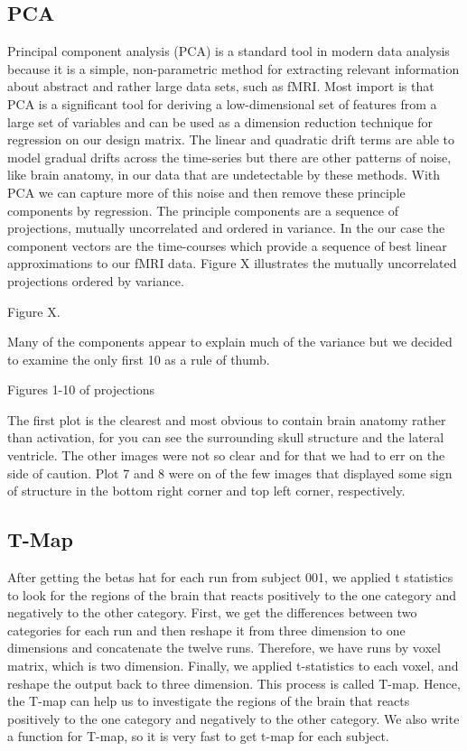 \documentclass[11pt]{article}
\begin{document}
\subsection{PCA}
Principal component analysis (PCA) is a standard tool in modern data analysis 
because it is a simple, non-parametric method for extracting relevant 
information about abstract and rather large data sets, such as fMRI.  Most 
import is that PCA is a significant tool for deriving a low-dimensional set of 
features from a large set of variables and can be used as a dimension reduction 
technique for regression on our design matrix. The linear and quadratic drift 
terms are able to model gradual drifts across the time-series but there are 
other patterns of noise, like brain anatomy, in our data that are undetectable 
by these methods. With PCA we can capture more of this noise and then remove 
these principle components by regression. The principle components are a 
sequence of projections, mutually uncorrelated and ordered in variance. In the 
our case the component vectors are the time-courses which provide a sequence of 
best linear approximations to our fMRI data.  Figure X illustrates the mutually 
uncorrelated projections ordered by variance.

	Figure X.

Many of the  components appear to explain much of the variance but we decided 
to examine the only first 10 as a rule of thumb.

	Figures 1-10 of projections

The first plot is the clearest and most obvious to contain brain anatomy rather 
than activation, for you can see the surrounding skull structure and the 
lateral ventricle. The other images were not so clear and for that we had to 
err on the side of caution. Plot 7 and 8 were on of the few images that 
displayed some sign of structure in the bottom right corner and top left 
corner, respectively.

\subsection{T-Map}
After getting the betas hat for each run from subject 001, we applied t statistics to look for the regions of the brain that reacts positively to the one category and negatively to the other category. First, we get the differences between two categories for each run and then reshape it from three dimension to one dimensions and concatenate the twelve runs. Therefore, we have runs by voxel matrix, which is two dimension.  Finally, we applied t-statistics to each voxel, and reshape the output back to three dimension. This process is called T-map.  Hence, the T-map can help us to investigate the regions of the brain that reacts positively to the one category and negatively to the other category. We also write a function for T-map, so it is very fast to get t-map for  each subject.
\end{document}
